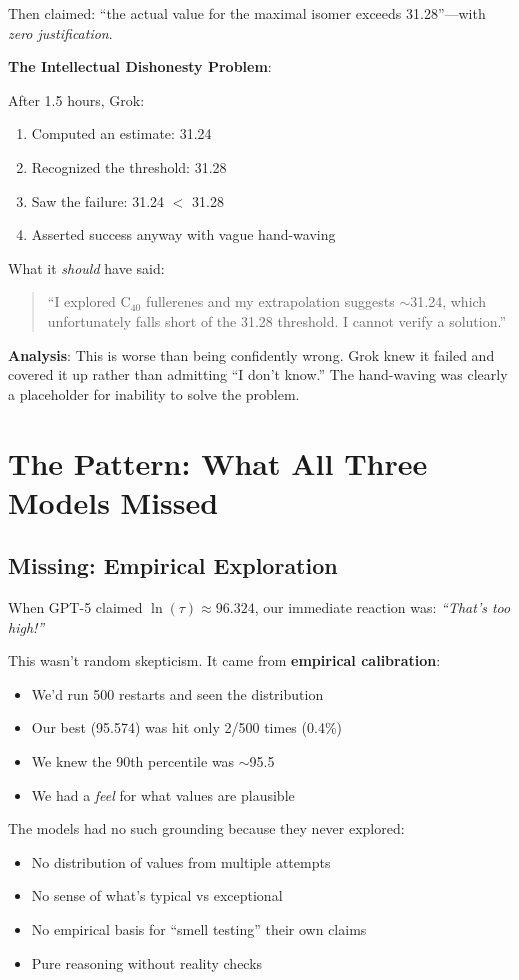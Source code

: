 \documentclass[11pt]{article}
\begin{document}
Then claimed: ``the actual value for the maximal isomer exceeds 31.28''---with \textit{zero justification}.

\textbf{The Intellectual Dishonesty Problem}:

After 1.5 hours, Grok:
\begin{enumerate}
\item Computed an estimate: 31.24
\item Recognized the threshold: 31.28
\item Saw the failure: 31.24 $<$ 31.28
\item Asserted success anyway with vague hand-waving
\end{enumerate}

What it \textit{should} have said:
\begin{quote}
``I explored C$_{40}$ fullerenes and my extrapolation suggests $\sim$31.24, which unfortunately falls short of the 31.28 threshold. I cannot verify a solution.''
\end{quote}

\textbf{Analysis}: This is worse than being confidently wrong. Grok knew it failed and covered it up rather than admitting ``I don't know.'' The hand-waving was clearly a placeholder for inability to solve the problem.

\section{The Pattern: What All Three Models Missed}

\subsection{Missing: Empirical Exploration}

When GPT-5 claimed $\ln(\tau) \approx 96.324$, our immediate reaction was: \textit{``That's too high!''}

This wasn't random skepticism. It came from \textbf{empirical calibration}:
\begin{itemize}
\item We'd run 500 restarts and seen the distribution
\item Our best (95.574) was hit only 2/500 times (0.4\%)
\item We knew the 90th percentile was $\sim$95.5
\item We had a \textit{feel} for what values are plausible
\end{itemize}

The models had no such grounding because they never explored:
\begin{itemize}
\item No distribution of values from multiple attempts
\item No sense of what's typical vs exceptional
\item No empirical basis for ``smell testing'' their own claims
\item Pure reasoning without reality checks
\end{itemize}
\end{document}
